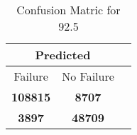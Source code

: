\begin{table}[] 
\caption{Confusion Matric for 92.5} 
\label{Table: Prediction Accuracy-DMD92.5OnlySunEKF-combinationReflection-Reflection} 
\centering 
\begin{tabular} 
 {@{}ccc@{}} 
\toprule 
\multicolumn{2}{c}{\textbf{Predicted}}
 \\ \midrule 
\multicolumn{1}{|c|}{Failure} & 
\multicolumn{1}{c|}{No Failure}
 \\ \midrule 
\multicolumn{1}{|c|}{\color{green}\textbf{108815}} & 
\multicolumn{1}{c|}{\color{red}\textbf{8707}}
 \\ \midrule 
\multicolumn{1}{|c|}{\color{red}\textbf{3897}} & 
\multicolumn{1}{c|}{\color{green}\textbf{48709}}
 \\ \bottomrule 
\end{tabular} 
\end{table} 
